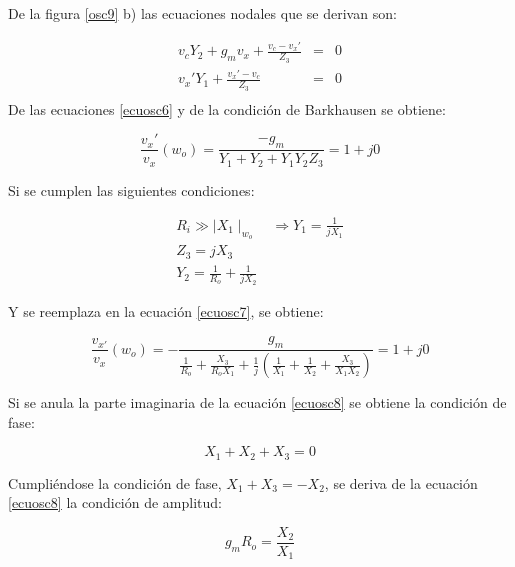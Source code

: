 De la figura \ref{osc9} b) las ecuaciones nodales que se derivan
son:

\begin{eqnarray}\label{ecuosc6}
	\nonumber
	v_cY_2+g_mv_x+\frac{\displaystyle v_c-v_x'}{\displaystyle Z_3}&=&0\\
	\nonumber
	v_x'Y_1+\frac{\displaystyle v_x'-v_c}{\displaystyle Z_3}&=&0\\
\end{eqnarray}
De las ecuaciones \ref{ecuosc6} y de la condición de Barkhausen se obtiene:

\begin{equation}\label{ecuosc7}
	\frac{\displaystyle v_x'}{\displaystyle v_x}(w_o)=\frac{\displaystyle -g_m}{\displaystyle
		Y_1+Y_2+Y_1Y_2Z_3}=1 + j0
\end{equation}

Si se cumplen las siguientes condiciones:

\begin{eqnarray}
	\nonumber
	R_i \gg \mid X_1\mid_{w_o}\quad\Rightarrow Y_1=\frac{\displaystyle 1}{\displaystyle jX_1}\\
	\nonumber
	Z_3=jX_3\\
	\nonumber
	Y_2=\frac{\displaystyle 1}{\displaystyle R_o}+\frac{\displaystyle 1}{\displaystyle jX_2}
	\nonumber
\end{eqnarray}

Y se reemplaza en la ecuación \ref{ecuosc7}, se obtiene:

\begin{equation}\label{ecuosc8}
	\frac{\displaystyle v_{x'}}{\displaystyle v_x}(w_o)=-\frac{\displaystyle g_m}{\displaystyle \frac{\displaystyle 1}{\displaystyle R_o}+\frac{\displaystyle X_3}{\displaystyle R_oX_1}+\frac{\displaystyle 1}{\displaystyle j}\left(\frac{\displaystyle 1}{\displaystyle X_1}+\frac{\displaystyle 1}{\displaystyle X_2}+\frac{\displaystyle X_3}{\displaystyle
			X_1X_2}\right)}=1+j0
\end{equation}

Si se anula la parte imaginaria de la ecuación \ref{ecuosc8} se
obtiene la condición de fase:

\begin{equation}\label{ecuosc9}
	X_1+X_2+X_3=0
\end{equation}

Cumpliéndose la condición de fase, $X_1+X_3=-X_2$, se deriva de la
ecuación \ref{ecuosc8} la condición de amplitud:

\begin{equation}\label{ecuosc10}
	g_mR_o=\frac{\displaystyle X_2}{\displaystyle X_1}
\end{equation}

